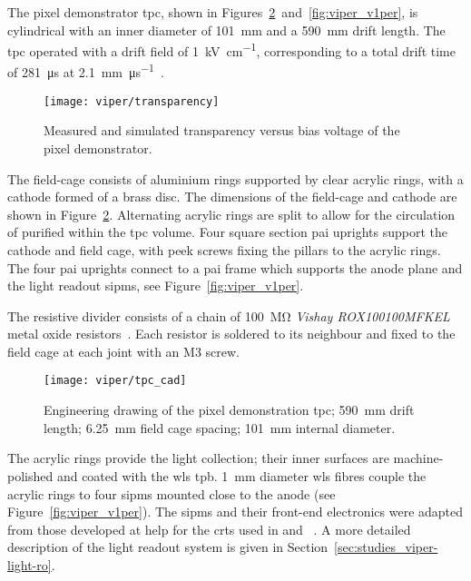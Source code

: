 The pixel demonstrator \gls{tpc}, shown in Figures~\ref{fig:viper_cad}~and~\ref{fig:viper_v1per}, is cylindrical with an inner diameter of \SI{101}{\milli\metre} and a \SI{590}{\milli\metre} drift length. 
The \gls{tpc} operated with a drift field of \SI{1}{\kilo\volt\per\centi\metre}, corresponding to a total drift time of \SI{281}{\micro\second} at \SI{2.1}{\milli\metre\per\micro\second}~\cite{protoLASER}.

\begin{figure}[tbp]
	\centering
	\texttt{[image: viper/transparency]}
	\caption[Pixel demonstrator charge readout transparency]{%
		Measured and simulated transparency versus bias voltage of the \AC{} pixel demonstrator.~\cite{francypants}
	}
	\label{fig:viper_transparency}
\end{figure}

The field-cage consists of aluminium rings supported by clear acrylic rings, with a cathode formed of a brass disc. 
The dimensions of the field-cage and cathode are shown in Figure~\ref{fig:viper_cad}.
Alternating acrylic rings are split to allow for the circulation of purified \lar{} within the \gls{tpc} volume.
Four square section \gls{pai} uprights support the cathode and field cage, with \gls{peek} screws fixing the pillars to the acrylic rings.
The four \gls{pai} uprights connect to a \gls{pai} frame which supports the anode plane and the light readout \glspl{sipm}, see Figure~\ref{fig:viper_v1per}.   

The resistive divider consists of a chain of \SI{100}{\mega\ohm} \emph{Vishay ROX100100MFKEL} metal oxide resistors~\cite{vishay}.
Each resistor is soldered to its neighbour and fixed to the field cage at each joint with an M3 screw.   

\begin{figure}[tbp]
	\centering
	\texttt{[image: viper/tpc\_cad]}
	\caption[Engineering drawing of pixel demonstrator ]{%
		Engineering drawing of the pixel demonstration \acrshort{tpc}; \SI{590}{\milli\metre} drift length; \SI{6.25}{\milli\metre} field cage spacing; \SI{101}{\milli\metre} internal diameter.
	}
	\label{fig:viper_cad}
\end{figure}

The acrylic rings provide the light collection; their inner surfaces are machine-polished and coated with the \gls{wls} \gls{tpb}. 
\SI{1}{\milli\metre} diameter \gls{wls} fibres couple the acrylic rings to four \glspl{sipm} mounted close to the anode (see Figure~\ref{fig:viper_v1per}). 
The \glspl{sipm} and their front-end electronics were adapted from those developed at \gls{help} for the \glspl{crt} used in \uboone{} and \sbnd{}~\cite{crt, crt_feb}.
A more detailed description of the light readout system is given in Section~\ref{sec:studies_viper-light-ro}.

